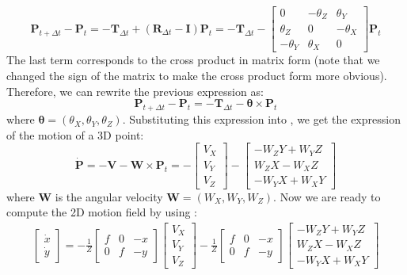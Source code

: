 \begin{equation}
    \mathbf{P}_{t+\Delta t} - \mathbf{P}_{t} = - \mathbf{T}_{\Delta t} + (\mathbf{R}_{\Delta t} - \mathbf{I}) \mathbf{P}_t =
    - \mathbf{T}_{\Delta t} -
    \begin{bmatrix}
        0         & -\theta_Z & \theta_Y  \\
        \theta_Z  & 0         & -\theta_X \\
        -\theta_Y & \theta_X  & 0
    \end{bmatrix}
    \mathbf{P}_t
\end{equation}
The last term corresponds to the cross product in matrix form (note that we changed the sign of the matrix to make the cross product form more obvious). Therefore, we can rewrite the previous expression as:
\begin{equation}
    \mathbf{P}_{t+\Delta t} - \mathbf{P}_{t} =
    - \mathbf{T}_{\Delta t} - \bm{\theta} \times \mathbf{P}_t
\end{equation}
where $\bm{\theta}=(\theta_X,\theta_Y, \theta_Z)$. Substituting this expression into \eqn{\ref{eq:general_camera_motion_equation_full}}, we get the expression of the motion of a 3D point:
\begin{equation}
    \dot{\mathbf{P}} = - \mathbf{V} - \mathbf{W} \times \mathbf{P}_t =
    -\begin{bmatrix}
        V_X \\
        V_Y \\
        V_Z
    \end{bmatrix}
    -
    \begin{bmatrix}
        -W_Z Y + W_Y Z \\
        W_Z X - W_X Z  \\
        -W_Y X + W_X Y
    \end{bmatrix}
\end{equation}
where $\mathbf{W}$ is the angular velocity $\mathbf{W}=(W_X,W_Y,W_Z)$. Now we are ready to compute the 2D motion field by using \eqn{\ref{eq:motionprojection}}:
\begin{align}
    \begin{bmatrix}
        \dot{x} \\
        \dot{y}
    \end{bmatrix}
    = -\frac{1}{Z}
    \begin{bmatrix}
        f & 0 & -x \\
        0 & f & -y
    \end{bmatrix}
    \begin{bmatrix}
        V_X \\
        V_Y \\
        V_Z
    \end{bmatrix}
    -\frac{1}{Z}
    \begin{bmatrix}
        f & 0 & -x \\
        0 & f & -y
    \end{bmatrix}
    \begin{bmatrix}
        -W_Z Y + W_Y Z \\
        W_Z X - W_X Z  \\
        -W_Y X + W_X Y
    \end{bmatrix}
\end{align}

